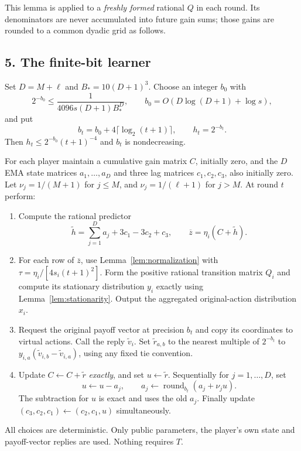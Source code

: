 \documentclass[11pt]{article}
\begin{document}
This lemma is applied to a \emph{freshly formed} rational $Q$ in each
round.  Its denominators are never accumulated into future gain
sums; those gains are rounded to a common dyadic grid as follows.

\subsection*{5. The finite-bit learner}
Set $D=M+\ell$ and $B_*=10(D+1)^3$.  Choose an integer $b_0$ with
\begin{equation}\label{eq:b0}
 2^{-b_0}\leq\frac1{4096s(D+1)B_*^D},
 \qquad b_0=O(D\log(D+1)+\log s),
\end{equation}
and put
\[
 b_t=b_0+4\lceil\log_2(t+1)\rceil,\qquad h_t=2^{-b_t}.
\]
Then $h_t\leq 2^{-b_0}(t+1)^{-4}$ and $b_t$ is nondecreasing.

For each player maintain a cumulative gain matrix $C$, initially zero,
and the $D$ EMA state matrices $a_1,\ldots,a_D$ and three lag
matrices $c_1,c_2,c_3$, also initially zero.  Let
$\nu_j=1/(M+1)$ for $j\leq M$, and
$\nu_j=1/(\ell+1)$ for $j>M$.  At round $t$ perform:
\begin{enumerate}
\item Compute the rational predictor
\[
 \widetilde h=\sum_{j=1}^Da_j+3c_1-3c_2+c_3,
 \qquad\overline z=\eta_i(C+\widetilde h).
\]
\item For each row of $\overline z$, use Lemma~\ref{lem:normalization}
with $\tau=\eta_i/[4s_i(t+1)^2]$.  Form the positive rational
transition matrix $Q_i$ and compute its stationary distribution $y_i$
exactly using Lemma~\ref{lem:stationarity}.  Output the aggregated
original-action distribution $x_i$.
\item Request the original payoff vector at precision $b_t$ and copy
its coordinates to virtual actions.  Call the reply $\widetilde v_i$.
Set $\widetilde r_{a,b}$ to the nearest multiple of $2^{-b_t}$ to
$y_{i,a}(\widetilde v_{i,b}-\widetilde v_{i,a})$, using any fixed
tie convention.
\item Update $C\leftarrow C+\widetilde r$ \emph{exactly}, and set
$u\leftarrow\widetilde r$.  Sequentially for $j=1,\ldots,D$, set
\[
 u\leftarrow u-a_j,\qquad
 a_j\leftarrow\operatorname{round}_{b_t}(a_j+\nu_j u).
\]
The subtraction for $u$ is exact and uses the old $a_j$.
Finally update $(c_3,c_2,c_1)\leftarrow(c_2,c_1,u)$ simultaneously.
\end{enumerate}
All choices are deterministic.  Only public parameters, the player's
own state and payoff-vector replies are used.  Nothing requires $T$.
\end{document}
